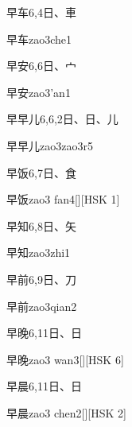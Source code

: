 \begin{Entry}{早车}{6,4}{⽇、⾞}
  \begin{Phonetics}{早车}{zao3che1}
  \end{Phonetics}
\end{Entry}

\begin{Entry}{早安}{6,6}{⽇、⼧}
  \begin{Phonetics}{早安}{zao3'an1}
  \end{Phonetics}
\end{Entry}

\begin{Entry}{早早儿}{6,6,2}{⽇、⽇、⼉}
  \begin{Phonetics}{早早儿}{zao3zao3r5}
  \end{Phonetics}
\end{Entry}

\begin{Entry}{早饭}{6,7}{⽇、⾷}
  \begin{Phonetics}{早饭}{zao3 fan4}[][HSK 1]
  \end{Phonetics}
\end{Entry}

\begin{Entry}{早知}{6,8}{⽇、⽮}
  \begin{Phonetics}{早知}{zao3zhi1}
  \end{Phonetics}
\end{Entry}

\begin{Entry}{早前}{6,9}{⽇、⼑}
  \begin{Phonetics}{早前}{zao3qian2}
  \end{Phonetics}
\end{Entry}

\begin{Entry}{早晚}{6,11}{⽇、⽇}
  \begin{Phonetics}{早晚}{zao3 wan3}[][HSK 6]
  \end{Phonetics}
\end{Entry}

\begin{Entry}{早晨}{6,11}{⽇、⽇}
  \begin{Phonetics}{早晨}{zao3 chen2}[][HSK 2]
  \end{Phonetics}
\end{Entry}

